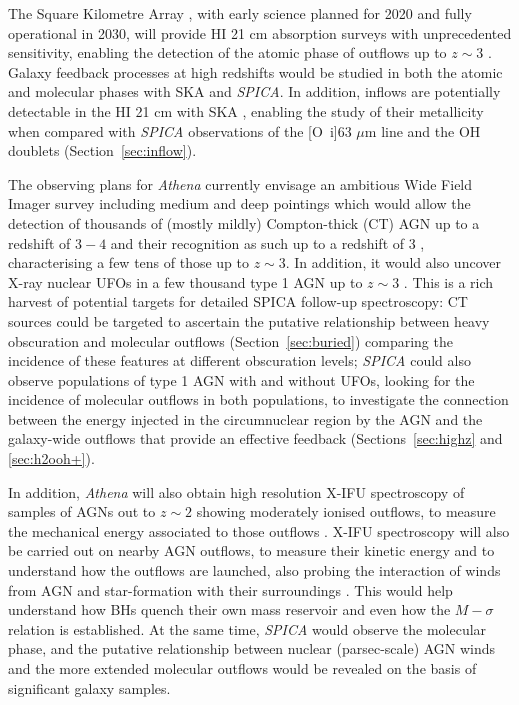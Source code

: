 \documentclass{pasa}%
\begin{document}
The Square Kilometre Array \citep[SKA, e.g.][]{mor15}, with early science
planned for 2020 and fully operational in 2030, will provide
HI 21 cm absorption surveys with unprecedented sensitivity, enabling the
detection of the atomic phase of outflows up to $z\sim3$ \citep{mor15}. 
Galaxy feedback processes at high redshifts would be studied in both the
atomic and molecular phases with SKA and {\it SPICA}. In addition, inflows 
are potentially detectable in the HI 21 cm with SKA 
\citep[as observed in the local NGC~4418,][]{cos13}, enabling the study of
their metallicity when compared with {\it SPICA} observations of the 
[O~{\sc i}]63 $\mu$m line and the OH doublets (Section~\ref{sec:inflow}).


The observing plans for {\it Athena} currently envisage an ambitious 
Wide Field Imager \citep[WFI,][]{mei16} survey including medium and deep
pointings which would allow the 
detection of thousands of (mostly mildly) Compton-thick (CT) AGN up to a
redshift of $3-4$ and their recognition as such up to a redshift of 3
\citep{car14}, characterising a few tens of those up to $z\sim3$. In addition,
it would also uncover X-ray nuclear UFOs in a few thousand type 1 AGN up to
$z\sim 3$ \citep{car15}. This is a rich harvest of potential targets for
detailed SPICA follow-up spectroscopy: CT sources could be targeted to
ascertain the putative relationship between heavy obscuration and molecular
outflows (Section~\ref{sec:buried}) comparing the incidence of these features
at different obscuration levels; {\it SPICA} could also observe populations of
type 1 AGN with and without UFOs, looking for the incidence of molecular
outflows in both populations, to investigate the connection between the energy
injected in the circumnuclear region by the AGN and the galaxy-wide outflows
that provide an effective feedback (Sections~\ref{sec:highz} and 
\ref{sec:h2ooh+}). 

In addition, {\it Athena} will also obtain high resolution X-IFU \citep{bar16}
spectroscopy of samples of AGNs out to $z\sim 2$ showing 
moderately ionised outflows, to measure the mechanical energy associated to
those outflows \citep{car15}. X-IFU spectroscopy will also be carried
out on nearby AGN outflows, to measure their kinetic energy and to understand
how the outflows are launched, also probing the interaction of winds from AGN
and star-formation with their surroundings \citep{pon15}.  This would
help understand how BHs quench their own mass reservoir and even how the 
$M - \sigma$  relation is established. At the same time, {\it SPICA} would
observe the molecular phase, and the putative relationship between nuclear
(parsec-scale) AGN winds and the more extended molecular outflows
\citep{tom15,fer15} would be revealed on the basis of significant galaxy
samples. 
\end{document}
